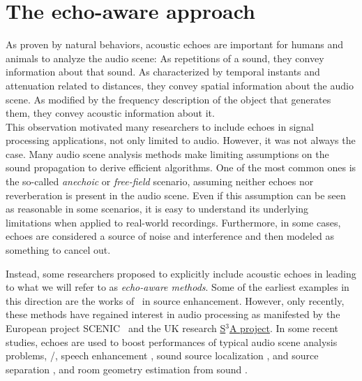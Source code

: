 \section{The echo-aware approach}
As proven by natural behaviors, acoustic echoes are important for humans and animals to analyze the audio scene:
As repetitions of a sound, they convey information about that sound.
As characterized by temporal instants and attenuation related to distances, they convey spatial information about the audio scene.
As modified by the frequency description of the object that generates them, they convey acoustic information about it.
\\This observation motivated many researchers to include echoes in signal processing applications, not only limited to audio.
However, it was not always the case.
Many audio scene analysis methods make limiting assumptions on the sound propagation to derive efficient algorithms.
One of the most common ones is the so-called \textit{anechoic} or \textit{free-field} scenario, assuming neither echoes nor reverberation is present in the audio scene.
Even if this assumption can be seen as reasonable in some scenarios, it is easy to understand its underlying limitations when applied to real-world recordings.
Furthermore, in some cases, echoes are considered a source of noise and interference and then modeled as something to cancel out.

\mynewline
Instead, some researchers proposed to explicitly include acoustic echoes in leading to what we will refer to as \textit{echo-aware methods}.
Some of the earliest examples in this direction are the works of~ in source enhancement.
However, only recently, these methods have regained interest in audio processing as manifested by the European project SCENIC~ and the UK research \href{http://www.s3a-spatialaudio.org/}{S$^3$A project}.
In some recent studies, echoes are used to boost performances of typical audio scene analysis problems, \eg/, speech enhancement , sound source localization , and source separation , and room geometry estimation from sound .

